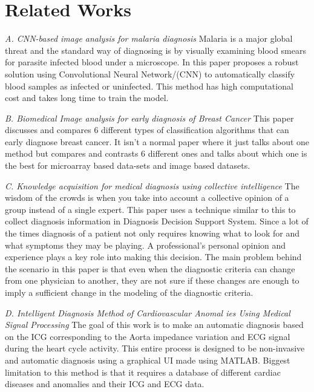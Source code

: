\documentclass[conference]{IEEEtran}
\begin{document}
\section{Related Works}
\textit{A. CNN-based image analysis for malaria diagnosis}
Malaria is a major global threat and the standard way of diagnosing is by visually examining blood smears for parasite infected blood under a microscope. In this paper proposes a robust solution using Convolutional Neural Network/(CNN) to automatically classify blood samples as infected or uninfected.
This method has high computational cost and takes long time to train the model.

\textit{B. Biomedical Image analysis for early diagnosis of Breast Cancer}
This paper discusses and compares 6 different types of classification algorithms that can early diagnose breast cancer. 
It isn't a normal paper where it just talks about one method but compares and contrasts 6 different ones and talks about which one is the best for microarray based data-sets and image based datasets.

\textit{C. Knowledge acquisition for medical diagnosis using collective intelligence }
The wisdom of the crowds is when you take into account a collective opinion of a group instead of a single expert. This paper uses a technique similar to this to collect diagnosis information in Diagnosis Decision Support System. Since a lot of the times diagnosis of a patient not only requires knowing what to look for and what symptoms they may be playing. A professional's personal opinion and experience plays a key role into making this decision.
The main problem behind the scenario in this paper is that even when the diagnostic criteria can change from one
physician to another, they are not sure if these changes
are enough to imply a sufficient change in the modeling of
the diagnostic criteria.

\textit{D. Intelligent Diagnosis Method of Cardiovascular Anomal ies Using Medical Signal Processing }
The goal of this work is to make an automatic diagnosis based on the ICG corresponding to the Aorta impedance variation and ECG signal during the heart cycle activity. This entire process is designed to be non-invasive and automatic diagnosis using a graphical UI made using MATLAB. Biggest limitation to this method is that it requires a database of different cardiac diseases and anomalies and their ICG and ECG data.
\end{document}
